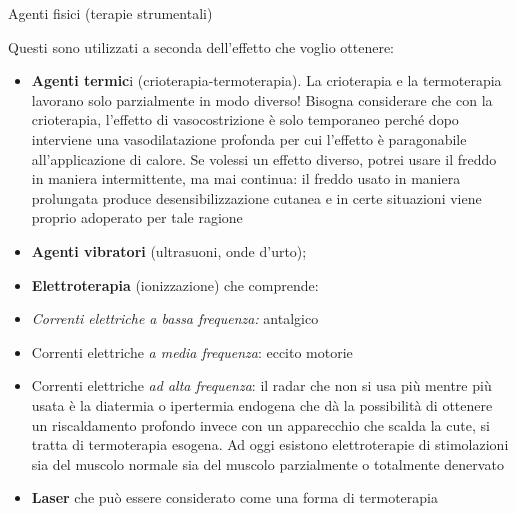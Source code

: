 \documentclass[]{article}
\begin{document}
Agenti fisici (terapie strumentali)

Questi sono utilizzati a seconda dell'effetto che voglio ottenere:

\begin{itemize}
\item
  \textbf{Agenti termic}i (crioterapia-termoterapia). La crioterapia e
  la termoterapia lavorano solo parzialmente in modo diverso! Bisogna
  considerare che con la crioterapia, l'effetto di vasocostrizione è
  solo temporaneo perché dopo interviene una vasodilatazione profonda
  per cui l'effetto è paragonabile all'applicazione di calore. Se
  volessi un effetto diverso, potrei usare il freddo in maniera
  intermittente, ma mai continua: il freddo usato in maniera prolungata
  produce desensibilizzazione cutanea e in certe situazioni viene
  proprio adoperato per tale ragione
\end{itemize}

\begin{itemize}
\item
  \textbf{Agenti vibratori} (ultrasuoni, onde d'urto);
\end{itemize}

\begin{itemize}
\item
  \textbf{Elettroterapia} (ionizzazione) che comprende:
\end{itemize}

\begin{itemize}
\item
  \emph{Correnti elettriche a bassa frequenza:} antalgico
\end{itemize}

\begin{itemize}
\item
  Correnti elettriche \emph{a media frequenza}: eccito motorie
\end{itemize}

\begin{itemize}
\item
  Correnti elettriche \emph{ad alta frequenza}: il radar che non si usa
  più mentre più usata è la diatermia o ipertermia endogena che dà la
  possibilità di ottenere un riscaldamento profondo invece con un
  apparecchio che scalda la cute, si tratta di termoterapia esogena. Ad
  oggi esistono elettroterapie di stimolazioni sia del muscolo normale
  sia del muscolo parzialmente o totalmente denervato
\end{itemize}

\begin{itemize}
\item
  \textbf{Laser} che può essere considerato come una forma di
  termoterapia
\end{itemize}
\end{document}
